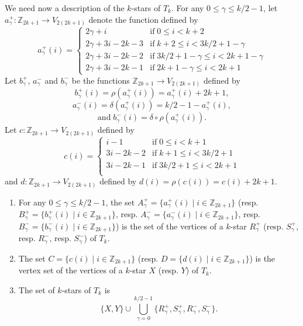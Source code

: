 \documentclass[12pt]{amsart}
\begin{document}
We need now a description of the $k$-stars of $T_k$. For any $0\le\gamma\le k/2-1$, let $a^+_\gamma:\mathbb{Z}_{2k+1}\to V_{2(2k+1)}$ denote the function defined by
$$a^+_{\gamma}(i)=\left\{\begin{array}{ll}
2\gamma+i  &  \mathrm{if}\;0\le i< k+2 \\
2\gamma+3i-2k-3  &  \mathrm{if}\;k+2\le i< 3k/2+1-\gamma \\
2\gamma+3i-2k-2  &  \mathrm{if}\;3k/2+1-\gamma\le i< 2k+1-\gamma \\
2\gamma+3i-2k-1  &  \mathrm{if}\;2k+1-\gamma\le i< 2k+1
\end{array}\right.$$
Let $b^+_{\gamma}$, $a^-_{\gamma}$ and $b^-_{\gamma}$ be the functions $\mathbb{Z}_{2k+1}\to V_{2(2k+1)}$ defined by
$$b^+_{\gamma}(i)=\rho(a^+_{\gamma}(i))=a^+_{\gamma}(i)+2k+1, $$
$$a^-_{\gamma}(i)=\delta(a^+_{\gamma}(i))=k/2-1-a^+_{\gamma}(i),$$
$$\mathrm{and}\; b^-_{\gamma}(i)=\delta\circ\rho(a^+_{\gamma}(i)).$$
Let $c:\mathbb{Z}_{2k+1}\to V_{2(2k+1)}$ defined by
$$c(i)=\left\{\begin{array}{ll}
i-1  &  \mathrm{if}\;0\le i< k+1 \\
3i-2k-2  &  \mathrm{if}\;k+1\le i< 3k/2+1 \\
3i-2k-1  &  \mathrm{if}\;3k/2+1\le i< 2k+1 \\
\end{array}\right.$$
and $d:\mathbb{Z}_{2k+1}\to V_{2(2k+1)}$ defined by $d(i)=\rho(c(i))=c(i)+2k+1$.

\begin{lemma}
\begin{enumerate}
\item For any $0\le\gamma\le k/2-1$, the set $A^+_{\gamma}=\{a^+_{\gamma}(i)\;|\; i\in\mathbb{Z}_{2k+1}\}$ (resp. $B^+_{\gamma}=\{b^+_{\gamma}(i)\;|\; i\in\mathbb{Z}_{2k+1}\}$, resp. $A^-_{\gamma}=\{a^-_{\gamma}(i)\;|\; i\in\mathbb{Z}_{2k+1}\}$, resp. $B^-_{\gamma}=\{b^-_{\gamma}(i)\;|\; i\in\mathbb{Z}_{2k+1}\}$) is the set of the vertices of a $k$-star $R^+_{\gamma}$ (resp. $S^+_{\gamma}$, resp. $R^-_{\gamma}$, resp. $S^-_{\gamma}$) of $T_k$.
\item The set $C=\{c(i)\;|\; i\in\mathbb{Z}_{2k+1}\}$ (resp. $D=\{d(i)\;|\; i\in\mathbb{Z}_{2k+1}\}$) is the vertex set of the vertices of a $k$-star $X$ (resp. $Y$) of $T_k$.
\item The set of $k$-stars of $T_k$ is
$$\{X,Y\}\cup\bigcup_{\gamma=0}^{k/2-1}\{R^+_{\gamma}, S^+_{\gamma}, R^-_{\gamma},S^-_{\gamma}\}.$$
\end{enumerate}
\end{lemma}
\end{document}
